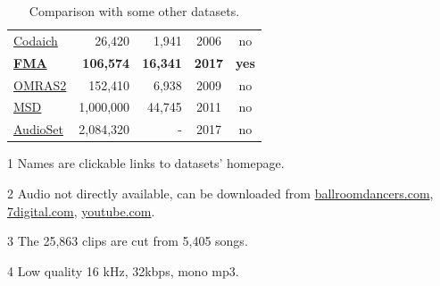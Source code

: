 \documentclass{article}
\newcommand{\ntracks}{106,574 }
\newcommand{\nartists}{16,341 }
\begin{document}
\begin{table}[t]
\begin{threeparttable}
\begin{tabular}{l@{ }rrcc}
		\href{http://jmir.sourceforge.net/index_Codaich.html}{Codaich} \cite{codaich} & 26,420 & 1,941 & 2006 & no \\ %
		\bf \href{https://github.com/anonymous/}{FMA} & \bf \ntracks & \bf \nartists & \bf 2017 & \bf yes \\
		\href{http://www.omras2.org/}{OMRAS2} \cite{omras} & 152,410 & 6,938 & 2009 & no \\
		\href{https://labrosa.ee.columbia.edu/millionsong/}{MSD} \cite{msd} & 1,000,000 & 44,745 & 2011 & no\tnote{2} \\
		\href{https://research.google.com/audioset/}{AudioSet} \cite{audioset} & 2,084,320 & - & 2017 & no\tnote{2} \\
		\bottomrule
	\end{tabular}
	\begin{tablenotes}
		\item[1] Names are clickable links to datasets' homepage.
		\item[2] Audio not directly available, can be downloaded from \href{http://www.ballroomdancers.com}{ballroomdancers.com}, \href{https://www.7digital.com}{7digital.com}, \href{https://www.youtube.com}{youtube.com}.
		\item[3] The 25,863 clips are cut from 5,405 songs.
		\item[4] Low quality 16 kHz, 32kbps, mono mp3.
	\end{tablenotes}
	\end{threeparttable}
	\caption{Comparison with some other datasets.} %
	\label{tab:datasets}
\end{table}
\end{document}

